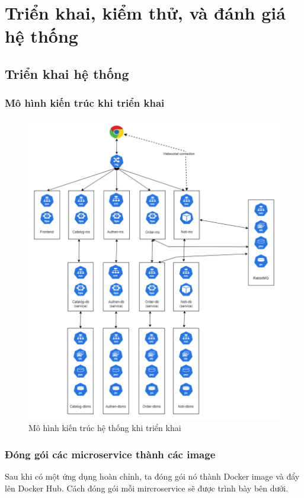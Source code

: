 \chapter{Triển khai, kiểm thử, và đánh giá hệ thống}
\section{Triển khai hệ thống}
\subsection{Mô hình kiến trúc khi triển khai}
\begin{figure}[H]
  \begin{center}
      \includegraphics[scale = 0.36]{images/hanh/DATN_architecture}
  \end{center}
  \caption{Mô hình kiến trúc hệ thống khi triển khai}
  \label{fig:architecture-deploy}

\end{figure}
\subsection{Đóng gói các microservice thành các image}
\noindent Sau khi có một ứng dụng hoàn chỉnh, ta đóng gói nó thành Docker image và đẩy lên Docker Hub. Cách đóng gói mỗi mircroservice sẽ được trình bày bên dưới.

